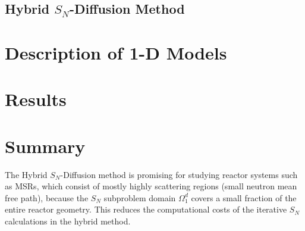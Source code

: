 \subsection{Hybrid $S_N$-Diffusion Method}



\section{Description of 1-D Models}

\section{Results} \label{sec:prelim-results}

\section{Summary}

The Hybrid $S_N$-Diffusion method is promising for studying reactor systems such as \glspl{MSR},
which consist of mostly highly scattering regions (small neutron mean free path), because the $S_N$
subproblem domain $\Omega^d_1$ covers a small fraction of the entire reactor geometry. This
reduces the computational costs of the iterative $S_N$ calculations in the hybrid method.
